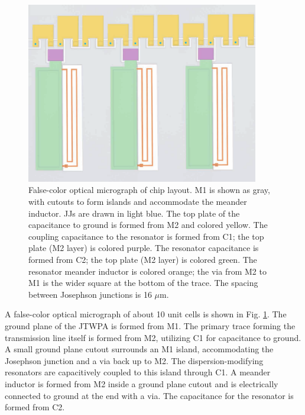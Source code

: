 \begin{figure}
\begin{center}
\includegraphics[width=4in]{twpa_exp/chip_false_color.pdf}
\end{center}
\caption[RPM JTWPA false-color optical micrograph]{False-color optical micrograph of chip layout.  M1 is shown as gray, with cutouts to form islands and accommodate the meander inductor.  JJs are drawn in light blue.  The top plate of the capacitance to ground is formed from M2 and colored yellow.  The coupling capacitance to the resonator is formed from C1; the top plate (M2 layer) is colored purple.  The resonator capacitance is formed from C2; the top plate (M2 layer) is colored green.  The resonator meander inductor is colored orange; the via from M2 to M1 is the wider square at the bottom of the trace.  The spacing between Josephson junctions is 16 $\mu$m.}
\label{fig:chip}
\end{figure}

A false-color optical micrograph of about 10 unit cells is shown in Fig. \ref{fig:chip}.  The ground plane of the JTWPA is formed from M1.  The primary trace forming the transmission line itself is formed from M2, utilizing C1 for capacitance to ground.  A small ground plane cutout surrounds an M1 island, accommodating the Josephson junction and a via back up to M2.  The dispersion-modifying resonators are capacitively coupled to this island through C1.  A meander inductor is formed from M2 inside a ground plane cutout and is electrically connected to ground at the end with a via.  The capacitance for the resonator is formed from C2.

